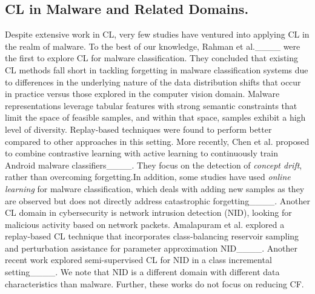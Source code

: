 





\subsection{CL in Malware and Related Domains.} 
Despite extensive work in CL, very few studies have ventured into applying CL in the realm of malware. To the best of our knowledge, Rahman et al.____ were the first to explore CL for malware classification. They concluded that existing CL methods fall short in tackling forgetting in malware classification systems due to differences in the underlying nature of the data distribution shifts that occur in practice versus those explored in the computer vision domain. Malware representations leverage tabular features with strong semantic constraints that limit the space of feasible samples, and within that space, samples exhibit a high level of diversity. Replay-based techniques were found to perform better compared to other approaches in this setting. More recently, Chen et al. proposed to combine contrastive learning with active learning to continuously train Android malware classifiers____. They focus on the detection of {\em concept drift}, rather than overcoming forgetting.In addition, some studies have used \emph{online learning} for malware classification, which deals with adding new samples as they are observed but does not directly address catastrophic forgetting____. 
Another CL domain in cybersecurity is network intrusion detection (NID), looking for malicious activity based on network packets. Amalapuram et al. explored a replay-based CL technique that incorporates class-balancing reservoir sampling and perturbation assistance for parameter approximation NID____. Another recent work explored semi-supervised CL for NID in a class incremental setting____. We note that NID is a different domain with different data characteristics than malware. Further, these works do not focus on reducing CF. 





